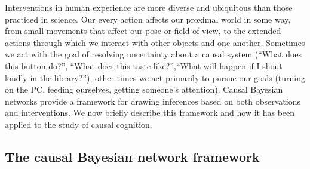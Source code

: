 \documentclass{cambridge7A}%
\begin{document}
Interventions in human experience are more diverse and ubiquitous than those practiced in science.  Our every action affects our proximal world in some way, from small movements that affect our pose or field of view, to the extended actions through which we interact with other objects and one another.  Sometimes we act with the goal of resolving uncertainty about a causal system (``What does this button do?'', ``What does this taste like?'',``What will happen if I shout loudly in the library?''), other times we act primarily to pursue our goals (turning on the PC, feeding ourselves, getting someone's attention).  Causal Bayesian networks \citep{pearl2000causality} provide a framework for drawing inferences based on both observations and interventions. 
We now briefly describe this framework and how it has been applied to the study of causal cognition.


\subsection{The causal Bayesian network framework}
\end{document}

